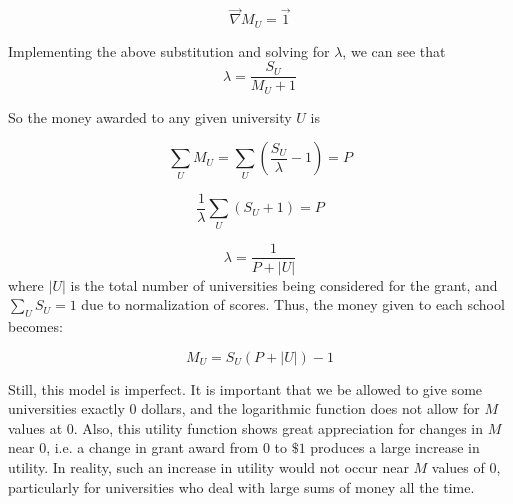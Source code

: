 \documentclass[paper.tex]{subfiles}
\begin{document}
	$$ \vec{\nabla} M_{U} = \vec{1} $$
	
	Implementing the above substitution and solving for $\lambda$, we can see that	
	$$\lambda = \dfrac{S_{U}}{M_{U}+1} $$
	
	So the money awarded to any given university $U$ is
	
	$$ \sum_{U}M_{U} = \sum_{U}(\dfrac{S_{U}}{\lambda} - 1) = P $$
	
	$$ \dfrac{1}{\lambda} \sum_{U}(S_{U} + 1) = P $$
	
	$$ \lambda = \dfrac{1}{P + |U|}$$
	where $|U|$ is the total number of universities being considered for the grant, and $\sum_{U}S_{U} = 1$ due to normalization of scores. Thus, the money given to each school becomes:
	
	$$ M_{U} = S_{U}(P+|U|) - 1$$
	
 	Still, this model is imperfect. It is important that we be allowed to give some universities exactly $0$ dollars, and the logarithmic function does not allow for $M$ values at $0$. Also, this utility function shows great appreciation for changes in $M$ near $0$, i.e. a change in grant award from $0$ to $\$1$ produces a large increase in utility. In reality, such an increase in utility would not occur near $M$ values of $0$, particularly for universities who deal with large sums of money all the time.
	
\end{document}

